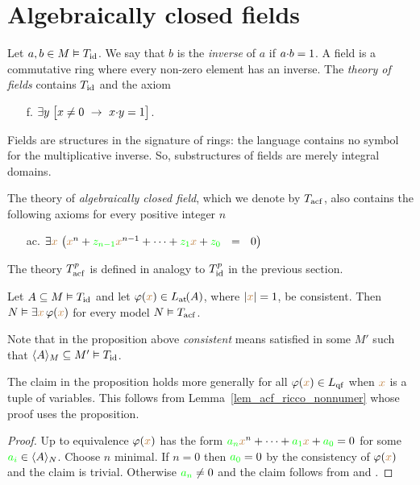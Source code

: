 \documentclass[creche.tex]{subfiles}
\begin{document}
\section{Algebraically closed fields}

Let $a,b\in M\models T_{\rm id}$. We say that $b$ is the \emph{inverse\/} of $a$ if $a\mdot b=1$. A field is a commutative ring where every non-zero element has an inverse. The \emph{theory of fields\/} contains $T_{\rm id}$ and the axiom
\begin{itemize}
\item[f.]$\E  y\; \big[x\neq0\ \imp\ x\mdot y =1\big]$.
\end{itemize}
Fields are structures in the signature of rings: the language contains no symbol for the multiplicative inverse. So, substructures of fields are merely integral domains.

The theory of \emph{algebraically closed field}, which we denote by \emph{$T_{\rm acf}$}, also contains the following axioms for every positive integer $n$

\begin{itemize}
\item[ac.] $\E {\mr x}\ \big( {\mr x}^{n} + {\gr z_{n-1}} {\mr x}^{n-1} + \dots + {\gr z_1}  {\mr x} + {\gr z_0}\ \ =\ \ 0\big)$
\end{itemize}

The theory \emph{$T^p_{\rm acf}$} is defined in analogy to $T^p_{\rm id}$ in the previous section.

\begin{proposition}\label{prop_acf_cons_sodd}
Let $A\subseteq M\models T_{\rm id}$ and let $\phi({\mr x})\in\atL(A)$, where $|{\mr x}|=1$, be consistent. Then $N\models\E {\mr x} \,\phi({\mr x})$ for every model $N\models T_{\rm acf}$.
\end{proposition}

Note that in the proposition above \textit{consistent\/} means satisfied in some $M'$ such that $\<A\>_M\subseteq M'\models T_{\rm id}$.

The claim in the proposition holds more generally for all $\phi({\mr x})\in L_{\rm qf}$ when ${\mr x}$ is a tuple of variables. This follows from Lemma~\ref{lem_acf_ricco_nonnumer} whose proof uses the proposition.

\begin{proof}
Up to equivalence $\phi({\mr x})$ has the form ${\gr a_n}{\mr x}^n + \dots + {\gr a_1} {\mr x} + {\gr a_0}=0$ for some ${\gr a_i}\in\<A\>_N$. Choose $n$ minimal. If $n=0$ then ${\gr a_0}=0$ by the consistency of $\phi({\mr x})$ and the claim is trivial. Otherwise ${\gr a_n}\neq0$ and the claim follows from  and . 
\end{proof}
\end{document}
